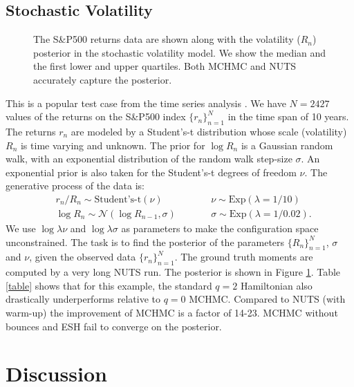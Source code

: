 \documentclass[twoside,11pt]{article}
\begin{document}
\subsection{Stochastic Volatility}
        
    \begin{figure}
        \caption{The S\&P500 returns data are shown along with the volatility ($R_n$) posterior in the stochastic volatility model. We show the median and the first lower and upper quartiles. Both MCHMC and NUTS accurately capture the posterior.}
        \label{fig:stochastic volatility}
    \end{figure}
    
    This is a popular test case from the time series analysis \citep{NUTS, NummPyro}. We have $N = 2427$ values of the returns on the S\&P500 index $\{ r_n\}_{n = 1}^{N}$ in the time span of 10 years. The returns $r_n$ are modeled by a Student's-t distribution whose scale (volatility) $R_n$ is time varying and unknown. The prior for $\log R_n$ is a Gaussian random walk, with an exponential distribution of the random walk step-size $\sigma$. An exponential prior is also taken for the Student's-t degrees of freedom $\nu$. The generative process of the data is:
    \begin{align}
        &r_n / R_n \sim \text{Student's-t}(\nu) \qquad 
        &&\nu \sim \text{Exp}(\lambda = 1/10) \\ \nonumber
        &\log R_n \sim \mathcal{N}(\log R_{n-1}, \sigma) \qquad
        &&\sigma \sim \text{Exp}(\lambda = 1/0.02).
    \end{align}
    We use $\log \lambda \nu$ and $\log \lambda \sigma$ as parameters to make the configuration space unconstrained. The task is to find the posterior of the parameters $\{R_n\}_{n =1}^N$, $\sigma$ and $\nu$, given the observed data $\{r_n\}_{n =1}^N$.
    The ground truth moments are computed by a very long NUTS run. The posterior is shown in Figure \ref{fig:stochastic volatility}.
    Table \ref{table} shows that for this example, the standard $q=2$ Hamiltonian also
    drastically underperforms relative to $q=0$ MCHMC. Compared to NUTS (with warm-up) the improvement of MCHMC is a factor of 14-23. MCHMC without bounces and ESH fail to converge on the posterior.



\section{Discussion}
\end{document}
